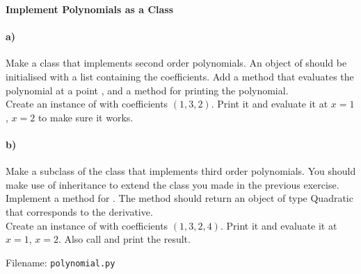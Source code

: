 \newpage
\begin{Problem}{\textbf{Implement Polynomials as a Class}} \label{prob92}

\paragraph{a)}
Make a class  that implements second order polynomials. An
object of  should be initialised with a list containing the
coefficients. Add a  method that evaluates the
polynomial at a point , and a  method
for printing the polynomial.
\\
Create an instance of  with coefficients $(1, 3, 2)$. Print it and
evaluate it at $x=1$, $x=2$ to make sure it works.

\paragraph{b)}
Make a subclass  of the class  that implements third order
polynomials. You should make use of inheritance to extend the class
 you made in the previous exercise. Implement a method
 for . The method should return an object
of type Quadratic that corresponds to the derivative.
\\
Create an instance of  with coefficients $(1, 3, 2, 4)$. Print it
and evaluate it at $x=1$, $x=2$. Also call  and print the result.

Filename: \texttt{polynomial.py}
\end{Problem}

